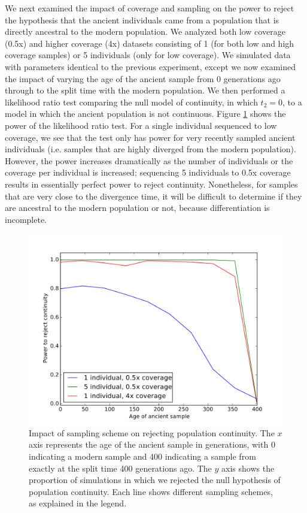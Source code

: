 \documentclass[11pt, oneside]{article}   	%
\begin{document}
We next examined the impact of coverage and sampling on the power to reject the hypothesis that the ancient individuals came from a population that is directly ancestral to the modern population. We analyzed both low coverage (0.5x) and higher coverage (4x) datasets consisting of 1 (for both low and high coverage samples) or 5 individuals (only for low coverage). We simulated data with parameters identical to the previous experiment, except we now examined the impact of varying the age of the ancient sample from 0 generations ago through to the split time with the modern population. We then performed a likelihood ratio test comparing the null model of continuity, in which $t_2 = 0$, to a model in which the ancient population is not continuous. Figure \ref{continuity} shows the power of the likelihood ratio test. For a single individual sequenced to low coverage, we see that the test only has power for very recently sampled ancient individuals (i.e. samples that are highly diverged from the modern population). However, the power increases dramatically as the number of individuals or the coverage per individual is increased; sequencing 5 individuals to 0.5x coverage results in essentially perfect power to reject continuity. Nonetheless, for samples that are very close to the divergence time, it will be difficult to determine if they are ancestral to the modern population or not, because differentiation is incomplete.

\begin{figure}[h] %
   \centering
   \includegraphics[width=\textwidth]{continuity_rejection.pdf} 
   \caption{Impact of sampling scheme on rejecting population continuity. The $x$ axis represents the age of the ancient sample in generations, with 0 indicating a modern sample and 400 indicating a sample from exactly at the split time 400 generations ago. The $y$ axis shows the proportion of simulations in which we rejected the null hypothesis of population continuity. Each line shows different sampling schemes, as explained in the legend.}
   \label{continuity}
\end{figure}
\end{document}
